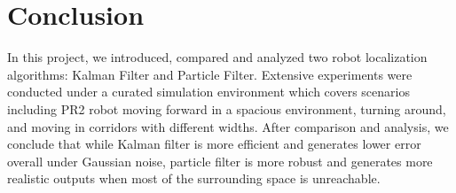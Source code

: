 \documentclass[conference,onecolumn]{IEEEtran}
\begin{document}




\section{Conclusion}
In this project, we introduced, compared and analyzed two robot localization algorithms: Kalman Filter and Particle Filter. Extensive experiments were conducted under a curated simulation environment which covers scenarios including PR2 robot moving forward in a spacious environment, turning around, and moving in corridors with different widths. After comparison and analysis, we conclude that while Kalman filter is more efficient and generates lower error overall under Gaussian noise, particle filter is more robust and generates more realistic outputs when most of the surrounding space is unreachable.


\clearpage
{}

\end{document}

